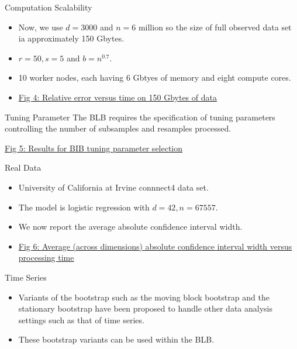 \documentclass[12pt]{beamer}
\begin{document}
\begin{frame}{Computation Scalability}
\begin{itemize}
\item Now, we use $d=3000$ and $n=6$ million so the size of full observed data set ia approximately 150 Gbytes.
\item $r=50,s=5$ and $b=n^{0.7}$.
\item 10 worker nodes, each having 6 Gbtyes of memory and eight compute cores.
\item \href{fig4.png}{\color{blue} Fig 4: Relative error versus time on 150 Gbytes of data}
\end{itemize}
\end{frame}

\begin{frame}{Tuning Parameter}
The BLB requires the specification of tuning parameters controlling the number of subsamples and resamples processed.

\href{fig5.png}{\color{blue} Fig 5: Results for BIB tuning parameter selection}
\end{frame}

\begin{frame}{Real Data}
\begin{itemize}
\item University of California at Irvine connnect4 data set.
\item The model is logistic regression with $d=42 , n=67557$.
\item We now report the average absolute confidence interval width.
\item \href{fig6.png}{\color{blue} Fig 6: Average (across dimensions) absolute confidence interval width versus processing time}
\end{itemize}
\end{frame}

\begin{frame}{Time Series}
\begin{itemize}
\item Variants of the bootstrap such as the moving block bootstrap and the stationary bootstrap  have been proposed to handle other data analysis settings such as that of time series.
\item These bootstrap variants can be used within the BLB.
\end{itemize}
\end{frame}
\end{document}
